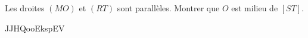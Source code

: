 
\begin{exercice}\label{exosmath-1001}

    Les droites \( (MO)\) et \( (RT)\) sont parallèles. Montrer que \( O\) est milieu de \( [ST]\).

JJHQooEkspEV

\end{exercice}
